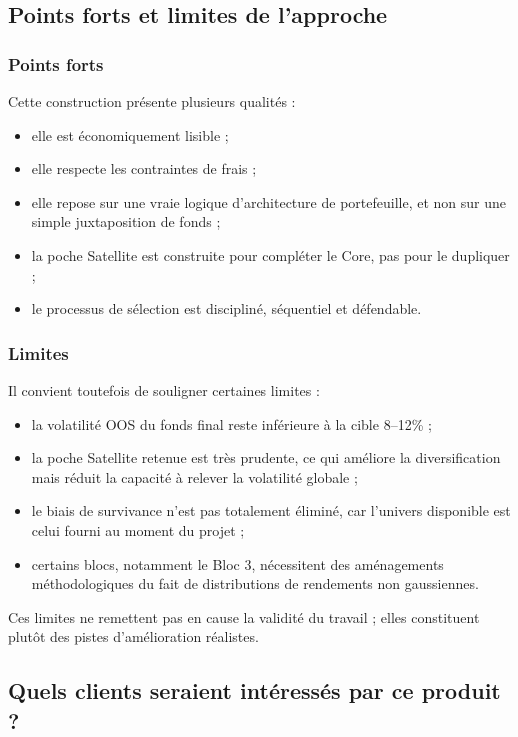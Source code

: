 \documentclass{article}
\begin{document}
\subsection{Points forts et limites de l’approche}

\subsubsection{Points forts}

Cette construction présente plusieurs qualités :
\begin{itemize}
    \item elle est économiquement lisible ;
    \item elle respecte les contraintes de frais ;
    \item elle repose sur une vraie logique d’architecture de portefeuille, et non sur une simple juxtaposition de fonds ;
    \item la poche Satellite est construite pour compléter le Core, pas pour le dupliquer ;
    \item le processus de sélection est discipliné, séquentiel et défendable.
\end{itemize}

\subsubsection{Limites}

Il convient toutefois de souligner certaines limites :
\begin{itemize}
    \item la volatilité OOS du fonds final reste inférieure à la cible 8--12\% ;
    \item la poche Satellite retenue est très prudente, ce qui améliore la diversification mais réduit la capacité à relever la volatilité globale ;
    \item le biais de survivance n’est pas totalement éliminé, car l’univers disponible est celui fourni au moment du projet ;
    \item certains blocs, notamment le Bloc 3, nécessitent des aménagements méthodologiques du fait de distributions de rendements non gaussiennes.
\end{itemize}

Ces limites ne remettent pas en cause la validité du travail ; elles constituent plutôt des pistes d’amélioration réalistes.

\subsection{Quels clients seraient intéressés par ce produit ?}
\end{document}
